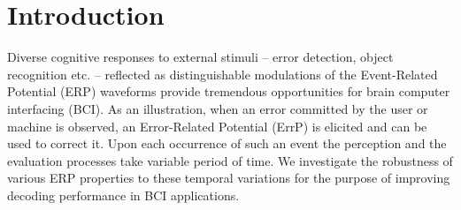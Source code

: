 \documentclass[12pt]{iopart}
\begin{document}

\section{Introduction}
\label{sec:intro}

Diverse cognitive responses to external stimuli --
error detection, object recognition etc. -- reflected as distinguishable modulations of
the Event-Related Potential (ERP) waveforms provide tremendous opportunities for brain computer interfacing (BCI). 
As an illustration, when an error committed by
the user or machine is observed, an Error-Related Potential (ErrP) is elicited
and can be used to correct it. Upon each occurrence of such an event the perception 
and the evaluation processes take variable period of time.
We investigate the robustness of various ERP properties to these temporal
variations for the purpose of improving decoding performance in BCI applications.




\end{document}
